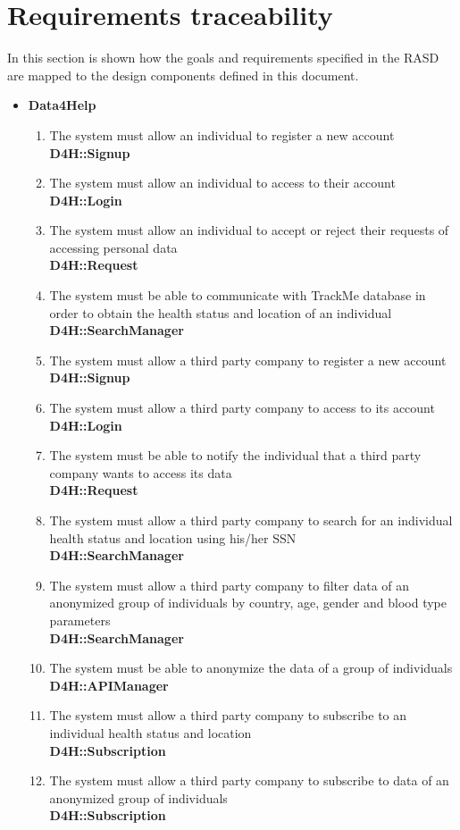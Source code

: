 \documentclass[a4paper, hidelinks, 12pt]{report}
\newcommand\requirement[1]{\item[{[R#1]}] }
\begin{document}
	\chapter{Requirements traceability}
	In this section is shown how the goals and requirements specified in the RASD are mapped to the design components defined in this document.
	
\begin{itemize}
	\item{\textbf{Data4Help}}
	\begin{enumerate}
		\requirement{1} The system must allow an individual to register a new account \\
		\textbf{D4H::Signup}
		\requirement{2} The system must allow an individual to access to their account \\
		\textbf{D4H::Login}
		\requirement{3} The system must allow an individual to accept or reject their requests of accessing personal data \\
		\textbf{D4H::Request}
		\requirement{4} The system must be able to communicate with TrackMe database in order to obtain the health status and location of an individual \\
		\textbf{D4H::SearchManager}
		\requirement{5} The system must allow a third party company to register a new account \\								\textbf{D4H::Signup}
		\requirement{6} The system must allow a third party company to access to its account 	\\								\textbf{D4H::Login}
		\requirement{7} The system must be able to notify the individual that a third party company wants to access its data \\
		\textbf{D4H::Request}
		\requirement{8} The system must allow a third party company to search for an individual health status and location using his/her SSN \\
		 \textbf{D4H::SearchManager}
		 \requirement{9} The system must allow a third party company to filter data of an anonymized group of individuals by country, age, gender and blood type parameters \\ 
		 \textbf{D4H::SearchManager}
		 \requirement{10} The system must be able to anonymize the data of a group of individuals \\
		 \textbf{D4H::APIManager}
		 \requirement{11} The system must allow a third party company to subscribe to an individual health status and location \\ 
		\textbf{D4H::Subscription}
		\requirement{12} The system must allow a third party company to subscribe to data of an anonymized group of individuals \\
		\textbf{D4H::Subscription}
	\end{enumerate}	
		

\end{itemize}
\end{document}
